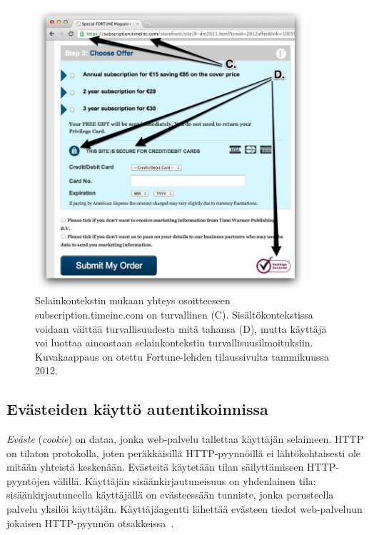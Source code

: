 \documentclass[finnish,gradu]{tktltiki}
\begin{document}
  \begin{figure}
    \centering
    \includegraphics[width=0.9\textwidth]{images/trust_context_html.jpg}
    \caption[Sisältökontekstin esittely.]{Selainkontekstin mukaan yhteys osoitteeseen subscription.timeinc.com on turvallinen (C). Sisältökontekstissa voidaan väittää turvallisuudesta mitä tahansa (D), mutta käyttäjä voi luottaa ainoastaan selainkontekstin turvallisuusilmoituksiin. Kuvakaappaus on otettu Fortune-lehden tilaussivulta tammikuussa 2012.}
    \label{fig:trust_context_html}
  \end{figure}




\subsection{Evästeiden käyttö autentikoinnissa} %
\label{ssub:keksien_käyttö_autentikoinnissa}

  \emph{Eväste} (\emph{cookie}) on dataa, jonka web-palvelu tallettaa käyttäjän selaimeen. HTTP on tilaton protokolla, joten peräkkäisillä HTTP-pyynnöillä ei lähtökohtaisesti ole mitään yhteistä keskenään. Evästeitä käytetään tilan säilyttämiseen HTTP-pyyntöjen välillä. Käyttäjän sisäänkirjautuneisuus on yhdenlainen tila: sisäänkirjautuneella käyttäjällä on evästeessään tunniste, jonka perusteella palvelu yksilöi käyttäjän. Käyttäjäagentti lähettää evästeen tiedot web-palveluun jokaisen HTTP-pyynnön otsakkeissa~\cite{ietf_rfc_http1.1}.
\end{document}
